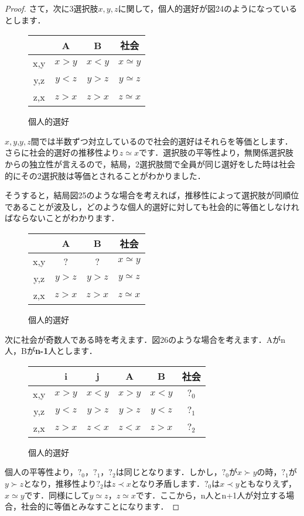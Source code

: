 \begin{proof}
さて，次に3選択肢$x,y,z$に関して，個人的選好が図24のようになっているとします．
\begin{figure}[!h]
    \centering
    \begin{tabular}[!h]{|c|c|c|c|} \hline
         & A & B & 社会 \\ \hline
        x,y & $x > y$ & $x < y$ & $x \simeq y$ \\ \hline
        y,z & $y < z$ & $y > z$ & $y \simeq z$ \\ \hline
        z,x & $z > x$ & $z > x$ & $z \simeq x$ \\ \hline
    \end{tabular}
    \caption{個人的選好}
\end{figure}
$x,y$,$y,z$間では半数ずつ対立しているので社会的選好はそれらを等価とします．さらに社会的選好の推移性より$z \simeq x$です．選択肢の平等性より，無関係選択肢からの独立性が言えるので，結局，2選択肢間で全員が同じ選好をした時は社会的にその2選択肢は等価とされることがわかりました．

そうすると，結局図25のような場合を考えれば，推移性によって選択肢が同順位であることが波及し，どのような個人的選好に対しても社会的に等価としなければならないことがわかります．
\begin{figure}[!h]
    \centering
    \begin{tabular}[!h]{|c|c|c|c|} \hline
         & A & B & 社会 \\ \hline
        x,y &    ?    &    ?    & $x \simeq y$ \\ \hline
        y,z & $y > z$ & $y > z$ & $y \simeq z$ \\ \hline
        z,x & $z > x$ & $z > x$ & $z \simeq x$ \\ \hline
    \end{tabular}
    \caption{個人的選好}
\end{figure}

次に社会が奇数人である時を考えます．図26のような場合を考えます．Aがn人，Bが{\bf n-1}人とします．
\begin{figure}[!h]
    \centering
    \begin{tabular}[!h]{|c|c|c|c|c|c|} \hline
         & i & j & A & B & 社会 \\ \hline
        x,y & $x > y$ & $x < y$ & $x > y$ & $x < y$ & $?_0$ \\ \hline
        y,z & $y < z$ & $y > z$ & $y > z$ & $y < z$ & $?_1$ \\ \hline
        z,x & $z > x$ & $z < x$ & $z < x$ & $z > x$ & $?_2$ \\ \hline
    \end{tabular}
    \caption{個人的選好}
\end{figure}
個人の平等性より，$?_0$，$?_1$，$?_2$は同じとなります．しかし，$?_0$が$x \succ y$の時，$?_1$が$y \succ z$となり，推移性より$?_2$は$z \prec x$となり矛盾します．$?_0$は$x \prec y$ともなりえず，$x \simeq y$です．同様にして$y \simeq z$，$z \simeq x$です．ここから，n人とn+1人が対立する場合，社会的に等価とみなすことになります．


\end{proof}
